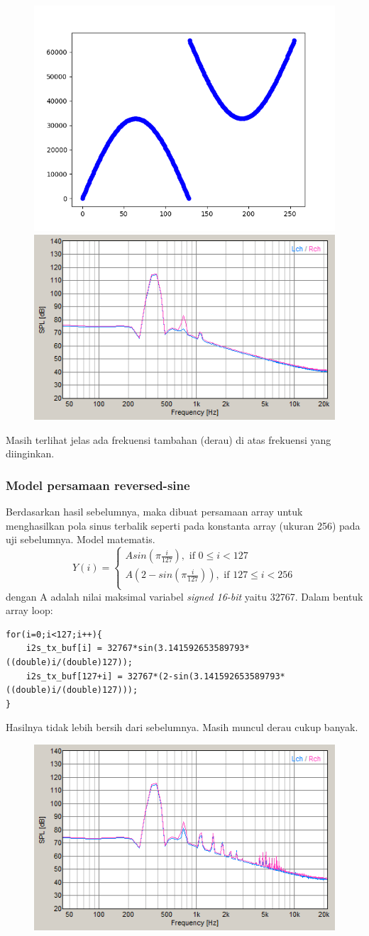 \documentclass[12pt,]{article}
\begin{document}
	\begin{figure}[H]
		\centering
		\includegraphics[width=0.45\linewidth]{result/day_1/rev_sine_table}
		\includegraphics[width=0.45\linewidth]{result/day_1/tableMax256}
	\end{figure}

	Masih terlihat jelas ada frekuensi tambahan (derau) di atas frekuensi yang diinginkan.     
	
	\subsubsection{Model persamaan reversed-sine}
	Berdasarkan hasil sebelumnya, maka dibuat persamaan array untuk menghasilkan pola sinus terbalik 
	seperti pada konstanta array (ukuran 256) pada uji sebelumnya.
	Model matematis.
	\[
	Y(i) = 
	\begin{cases}
	A sin(\pi \frac{i}{127}), \text{ if } 0 \leq i < 127\\
	A(2-sin(\pi \frac{i}{127})), \text{ if } 127 \leq i < 256\\
	\end{cases}
	 \]
	 dengan A adalah nilai maksimal variabel \textit{signed 16-bit} yaitu 32767.
	 Dalam bentuk array loop:
	 \begin{verbatim}
for(i=0;i<127;i++){
	i2s_tx_buf[i] = 32767*sin(3.141592653589793*((double)i/(double)127));
	i2s_tx_buf[127+i] = 32767*(2-sin(3.141592653589793*((double)i/(double)127)));
}
	 \end{verbatim}
	 Hasilnya tidak lebih bersih dari sebelumnya. Masih muncul derau cukup banyak.
	 \begin{figure}[H]
	 	\centering
	 	\includegraphics[width=0.45\linewidth]{result/day_1/halfMax256}
	 \end{figure}
 
\end{document}
